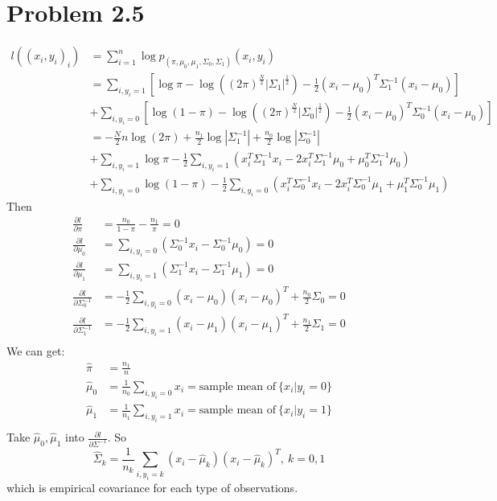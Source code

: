 \documentclass{article}
\newcommand{\pd}[2]{\frac{\partial {#1}}{\partial {#2}}}
\begin{document}
	\section{Problem 2.5}
	\begin{equation*}
	\begin{split}
	l((x_i,y_i)_i) &= \sum_{i=1}^n \log p_{(\pi,\mu_0,\mu_1,\Sigma_0,\Sigma_1)}(x_i,y_i)\\
	&=\sum_{i,y_i=1} [\log \pi -\log((2\pi)^\frac{N}{2} |\Sigma_1|^\frac{1}{2}) - \frac{1}{2} (x_i-\mu_0)^T \Sigma_1^{-1} (x_i-\mu_0) ]\\
	&+\sum_{i,y_i=0} [\log (1-\pi) -\log((2\pi)^\frac{N}{2} |\Sigma_0|^\frac{1}{2}) - \frac{1}{2} (x_i-\mu_0)^T \Sigma_0^{-1} (x_i-\mu_0) ]\\
	&= - \frac{N}{2} n \log(2\pi) + \frac{n_1}{2} \log|\Sigma_1^{-1}| + \frac{n_0}{2} \log|\Sigma_0^{-1}| \\
	&+ \sum_{i,y_i=1} \log \pi -\frac{1}{2} \sum_{i,y_i=1}(x_i^T\Sigma_1^{-1}x_i-2x_i^T\Sigma_1^{-1}\mu_0+\mu_0^T\Sigma_1^{-1}\mu_0)\\
	&+ \sum_{i,y_i=0} \log (1-\pi) -\frac{1}{2} \sum_{i,y_i=0}(x_i^T\Sigma_0^{-1}x_i-2x_i^T\Sigma_0^{-1}\mu_1+\mu_1^T\Sigma_0^{-1}\mu_1)
	\end{split}
	\end{equation*}
	Then
	\begin{equation*}
	\begin{split}
	\pd{l}{\pi} &= \frac{n_0}{1-\pi} - \frac{n_1}{\pi} = 0\\
	\pd{l}{\mu_0} &= \sum_{i,y_i=0} (\Sigma_0^{-1} x_i - \Sigma_0^{-1} \mu_0) = 0\\
	\pd{l}{\mu_1} &= \sum_{i,y_i=1} (\Sigma_1^{-1} x_i - \Sigma_1^{-1} \mu_1) = 0\\
	\pd{l}{\Sigma_0^{-1}} &=  -\frac{1}{2} \sum_{i,y_i=0} (x_i-\mu_0) (x_i-\mu_0)^T  + \frac{n_0}{2} \Sigma_0 = 0\\
	\pd{l}{\Sigma_1^{-1}} &=  -\frac{1}{2} \sum_{i,y_i=1} (x_i-\mu_1) (x_i-\mu_1)^T  + \frac{n_1}{2} \Sigma_1 = 0\\
	\end{split}
	\end{equation*}
	We can get:
	\begin{equation}
	\begin{split}
	\hat{\pi} &= \frac{n_1}{n}\\
	\hat{\mu}_0 &= \frac{1}{n_0} \sum_{i,y_i=0} x_i  = \text{sample mean of}\ \{x_i|y_i=0\}\\
	\hat{\mu}_1 &= \frac{1}{n_1} \sum_{i,y_i=1} x_i  = \text{sample mean of}\ \{x_i|y_i=1\}\\
	\end{split}
	\end{equation}
	Take $\hat{\mu}_0,\hat{\mu}_1$ into $\pd{l}{\Sigma^{-1}}$. So
	$$
	\hat{\Sigma}_k = \frac{1}{n_k} \sum_{i,y_i=k} (x_i-\hat{\mu}_k) (x_i-\hat{\mu}_k)^T, \ k=0,1
	$$
	which is empirical covariance for each type of observations.
	
\end{document}

